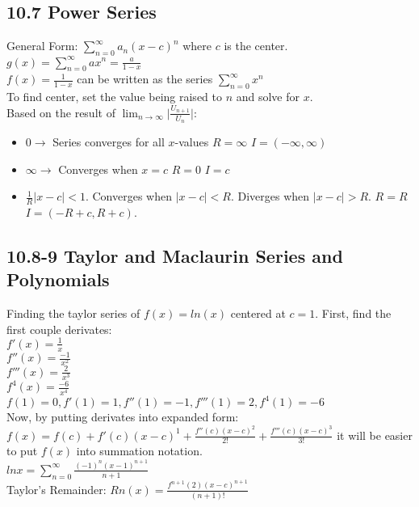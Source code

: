 \documentclass{article}
\begin{document}
        \subsection*{10.7 Power Series}
            General Form: $\sum_{n=0}^{\infty} a_{n}(x-c)^n$ where $c$ is the center. \\
            $g(x) = \sum_{n=0}^{\infty} ax^n = \frac{a}{1-x}$  \\
            $f(x) = \frac{1}{1-x}$ can be written as the series $\sum_{n=0}^{\infty} x^n$ \\
            To find center, set the value being raised to $n$ and solve for $x$. \\
            Based on the result of $\lim_{n\to\infty} \lvert \frac{U_{n+1}}{U_{n}} \rvert$:
            \begin{itemize}
                \item $0 \rightarrow$ Series converges for all $x$-values $R=\infty$ $I=(-\infty, \infty)$ \\
                \item $\infty \rightarrow$ Converges when $x=c$ $R=0$ $I={c}$ \\
                \item $\frac{1}{R} \lvert x-c \rvert < 1$. Converges when $\lvert x-c \rvert  < R$. Diverges when $\lvert x-c \rvert > R$. $R=R$ $I=(-R+c, R+c)$. \\
            \end{itemize}
        \color{Magenta}
        \subsection*{10.8-9 Taylor and Maclaurin Series and Polynomials }
            Finding the taylor series of $f(x) = ln(x)$ centered at $c=1$. First, find the first couple derivates: \\
            $f'(x) = \frac{1}{x}$ \\
            $f''(x) = \frac{-1}{x^2}$ \\
            $f'''(x) = \frac{2}{x^3}$ \\
            $f^4(x) = \frac{-6}{x^4}$ \\
            $f(1) = 0, f'(1) = 1, f''(1) = -1, f'''(1) = 2, f^4(1) = -6$ \\
            Now, by putting derivates into expanded form: $f(x) = f(c) + f'(c)(x-c)^1 + \frac{f''(c)(x-c)^2}{2!} + \frac{f'''(c)(x-c)^3}{3!}$ it will be easier to put $f(x)$ into summation notation. \\ 
            $ln x = \sum_{n=0}^{\infty} \frac{(-1)^n (x-1)^{n+1}}{n+1}$ \\
            Taylor's Remainder: $Rn(x)=\frac{f^{n+1}(2)(x-c)^{n+1}}{(n+1)!}$ \\
        \color{Black}
\end{document}
